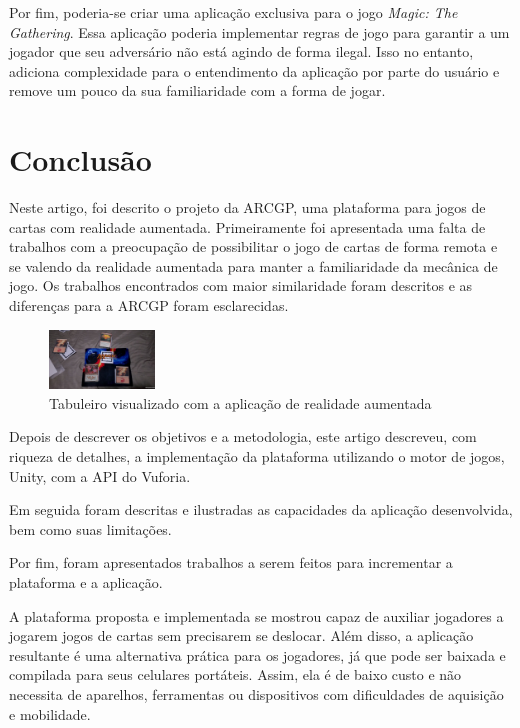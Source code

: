 \documentclass[conference]{IEEEtran}
\begin{document}
Por fim, poderia-se criar uma aplicação exclusiva para o jogo \textit{Magic: The 
Gathering}. Essa aplicação poderia implementar regras de jogo para garantir a um 
jogador que seu adversário não está agindo de forma ilegal. Isso no entanto, 
adiciona complexidade para o entendimento da aplicação por parte do usuário e 
remove um pouco da sua familiaridade com a forma de jogar.

\section{Conclusão}
\label{conclusao}
Neste artigo, foi descrito o projeto da ARCGP, uma plataforma para jogos de 
cartas com realidade aumentada. Primeiramente foi apresentada uma falta de 
trabalhos com a preocupação de possibilitar o jogo de cartas de forma remota e 
se valendo da realidade aumentada para manter a familiaridade da mecânica de 
jogo. Os trabalhos encontrados com maior similaridade foram descritos e as 
diferenças para a ARCGP foram esclarecidas.

\begin{figure}[t]
	\caption{Tabuleiro visualizado com a aplicação de realidade aumentada}
	\label{owntableaug}
	\centering
	\includegraphics[width=0.25\textwidth]{owntableaug}
\end{figure}

Depois de descrever os objetivos e a metodologia, este artigo descreveu, com 
riqueza de detalhes, a implementação da plataforma utilizando o motor de jogos, 
Unity, com a API do Vuforia.

Em seguida foram descritas e ilustradas as capacidades da aplicação 
desenvolvida, bem como suas limitações.

Por fim, foram apresentados trabalhos a serem feitos para incrementar a 
plataforma e a aplicação.

A plataforma proposta e implementada se mostrou capaz de auxiliar jogadores 
a jogarem jogos de cartas sem precisarem se deslocar. Além disso, a aplicação 
resultante é uma alternativa prática para os jogadores, já que pode ser baixada 
e compilada para seus celulares portáteis. Assim, ela é de baixo custo e não 
necessita de aparelhos, ferramentas ou dispositivos com dificuldades de 
aquisição e mobilidade.
\end{document}
